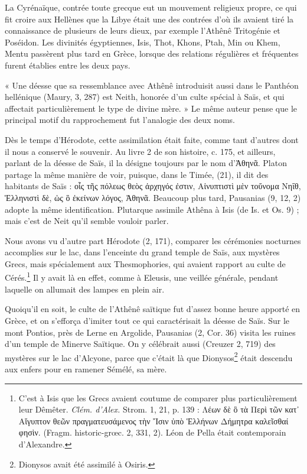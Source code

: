 \documentclass[letterpaper,twocolumn,openany,nodeprecatedcode]{dndbook}
\begin{document}
La Cyrénaïque, contrée toute grecque eut un mouvement religieux propre, ce qui fit croire aux Hellènes que la Libye était une des contrées d'où ils avaient tiré la connaissance de plusieurs de leurs dieux, par exemple l'Athênê Tritogénie et Poséidon. Les divinités égyptiennes, Isis, Thot, Khons, Ptah, Min ou Khem, Mentu passèrent plus tard en Grèce, lorsque des relations régulières et fréquentes furent établies entre les deux pays.

« Une déesse que sa ressemblance avec Athênê introduisit aussi dans le Panthéon hellénique (Maury, 3, 287) est Neith, honorée d'un culte spécial à Saïs, et qui affectait particulièrement le type de divine mère. » Le même auteur pense que le principal motif du rapprochement fut l'analogie des deux noms.

Dès le temps d'Hérodote, cette assimilation était faite, comme tant d'autres dont il nous a conservé le souvenir. Au livre 2 de son histoire, c. 175, et ailleurs, parlant de la déesse de Saïs, il la désigne toujours par le nom d'Ἀθηνᾶ. Platon partage la même manière de voir, puisque, dans le Timée, (21), il dit des habitants de Saïs : οἷς τῆς πόλεως θεὸς ἀρχηγός ἐστιν, Αἰνυπτιστὶ μὲν τοὔνομα Νηΐθ, Ἑλληνιστὶ δὲ, ὡς ὃ ἐκείνων λόγος, Ἀθηνᾶ. Beaucoup plus tard, Pausanias (9, 12, 2) adopte la même identification. Plutarque assimile Athêna à Isis (de Is. et Os. 9) ; mais c'est de Neit qu'il semble vouloir parler.

Nous avons vu d'autre part Hérodote (2, 171), comparer les cérémonies nocturnes accomplies sur le lac, dans l'enceinte du grand temple de Saïs, aux mystères Grecs, mais spécialement aux Thesmophories, qui avaient rapport au culte de Cérés.\footnote{C'est à Isis que les Grecs avaient coutume de comparer plus particulièrement leur Dêmêter. \emph{Clém. d'Alex.} Strom. 1, 21, p. 139 : Λέων δὲ ὃ τὰ Περὶ τῶν κατ᾽ Αἴγυπτον θεῶν πραγματευσάμενος τὴν Ἴσιν ὑπὸ Ἑλλήνων Δήμητρα καλεῖσθαί φησὶν. (Fragm. historic-grœc. 2, 331, 2). Léon de Pella était contemporain d'Alexandre.} Il y avait là en effet, comme à Eleusis, une veillée générale, pendant laquelle on allumait des lampes en plein air.

Quoiqu'il en soit, le culte de l'Athênê saïtique fut d'assez bonne heure apporté en Grèce, et on s'efforça d'imiter tout ce qui caractérisait la déesse de Saïs. Sur le mont Pontios, près de Lerne en Argolide, Pausanias (2, Cor. 36) visita les ruines d'un temple de Minerve Saïtique. On y célébrait aussi (Creuzer 2, 719) des mystères sur le lac d'Alcyone, parce que c'était là que Dionysos\footnote{Dionysos avait été assimilé à Osiris.} était descendu aux enfers pour en ramener Sémélé, sa mère.
\end{document}
